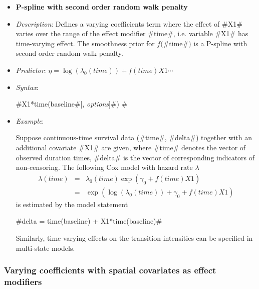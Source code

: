 \begin{itemize}
\item[]{\bf\sffamily P-spline with second order random walk
penalty}

\item[] {\em Description}: Defines a varying coefficients term
where the effect of #X1# varies over the range of the effect
modifier #time#, i.e. variable #X1# has time-varying effect. The
smoothness prior for $f($#time#$)$ is a P-spline with second order
random walk penalty.

 \item[] {\em Predictor}: $\eta = \log(\lambda_0(time)) +
f(time)X1 \cdots$ \item[] {\em Syntax}:

 #X1*time(baseline#[, {\em options}]#) #
 \item[] {\em Example}:

Suppose continuous-time survival data (#time#, #delta#) together
with an additional covariate #X1# are given, where #time# denotes
the vector of observed duration times, #delta# is the vector of
corresponding indicators of non-censoring. The following Cox model
with hazard rate $\lambda$
\begin{eqnarray*}
 \lambda(time) & = & \lambda_0(time)\exp(\gamma_0 + f(time)X1)\\
 & = & \exp\left(\log(\lambda_0(time)) + \gamma_0 + f(time)X1\right)
\end{eqnarray*}
is estimated by the model statement

#delta = time(baseline) + X1*time(baseline)#

Similarly, time-varying effects on the transition intensities can be
specified in multi-state models.
\end{itemize}

\subsubsection*{ Varying coefficients with spatial covariates as
effect modifiers}

